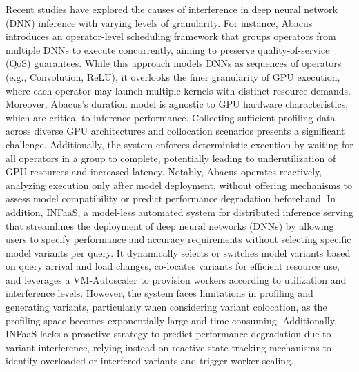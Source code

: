 Recent studies have explored the causes of interference in deep neural network (DNN) inference with varying levels of granularity. For instance, Abacus introduces an operator-level scheduling framework that groups operators from multiple DNNs to execute concurrently, aiming to preserve quality-of-service (QoS) guarantees. While this approach models DNNs as sequences of operators (e.g., Convolution, ReLU), it overlooks the finer granularity of GPU execution, where each operator may launch multiple kernels with distinct resource demands. Moreover, Abacus's duration model is agnostic to GPU hardware characteristics, which are critical to inference performance. Collecting sufficient profiling data across diverse GPU architectures and collocation scenarios presents a significant challenge. Additionally, the system enforces deterministic execution by waiting for all operators in a group to complete, potentially leading to underutilization of GPU resources and increased latency. Notably, Abacus operates reactively, analyzing execution only after model deployment, without offering mechanisms to assess model compatibility or predict performance degradation beforehand. In addition, INFaaS, a model-less automated system for distributed inference serving that streamlines the deployment of deep neural networks (DNNs) by allowing users to specify performance and accuracy requirements without selecting specific model variants per query. It dynamically selects or switches model variants based on query arrival and load changes, co-locates variants for efficient resource use, and leverages a VM-Autoscaler to provision workers according to utilization and interference levels. However, the system faces limitations in profiling and generating variants, particularly when considering variant colocation, as the profiling space becomes exponentially large and time-consuming. Additionally, INFaaS lacks a proactive strategy to predict performance degradation due to variant interference, relying instead on reactive state tracking mechanisms to identify overloaded or interfered variants and trigger worker scaling.

